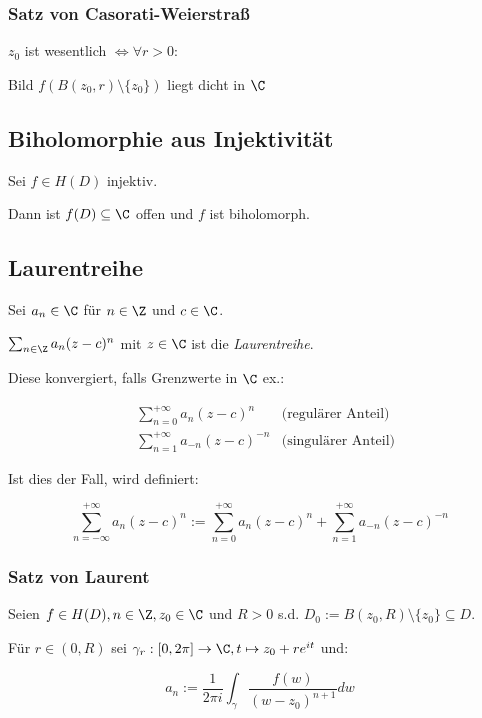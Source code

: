 \subsubsection*{Satz von Casorati-Weierstraß}

\(z_0\) ist wesentlich \(\iff \forall r > 0 :\)

Bild \(f(B(z_0,r) \setminus \{z_0\})\) liegt dicht in \(\C\)

\subsection*{Biholomorphie aus Injektivität}

Sei \(f \in H(D)\) injektiv.

Dann ist \(f(D) \subseteq \C\) offen und \(f\) ist biholomorph.

\subsection*{Laurentreihe}

Sei \(a_n \in \C\) für \(n \in \Z\) und \(c \in \C\).

			\(\sum_{n \in \Z} a_n (z-c)^n\) mit \(z \in \C\) ist die \emph{Laurentreihe}.

Diese konvergiert, falls Grenzwerte in \(\C\) ex.:

\vspace*{-4mm}
\begin{align*}
&\sum_{n=0}^{+\infty} a_n(z-c)^n & \text{(regulärer Anteil)} \\
&\sum_{n=1}^{+\infty} a_{-n}(z-c)^{-n} & \text{(singulärer Anteil)}
\end{align*}

Ist dies der Fall, wird definiert:

\vspace*{-4mm}
\[ \sum_{n=-\infty}^{+\infty} a_n(z-c)^n := \sum_{n=0}^{+\infty} a_n(z-c)^n + \sum_{n=1}^{+\infty} a_{-n}(z-c)^{-n} \]

\subsubsection*{Satz von Laurent}

Seien \(f \in H(D), n \in \Z, z_0 \in \C\) und \(R > 0\) s.d. \(D_0 := B(z_0,R) \setminus \{z_0\} \subseteq D\).

Für \(r \in (0,R)\) sei \(\gamma_r : [0,2\pi] \to \C, t \mapsto z_0 + re^{it}\) und:

\[ a_n := \frac{1}{2\pi i} \int_\gamma \frac{f(w)}{(w-z_0)^{n+1}} dw \]

